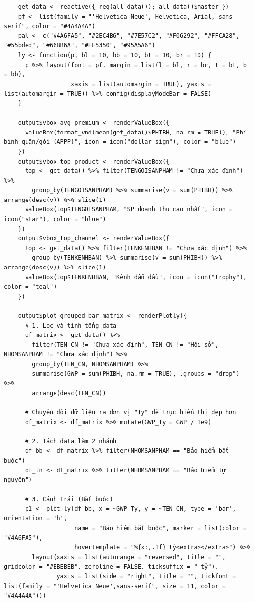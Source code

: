 \documentclass[12pt, a4paper]{article}
\begin{document}
\begin{lstlisting}
    get_data <- reactive({ req(all_data()); all_data()$master })
    pf <- list(family = "'Helvetica Neue', Helvetica, Arial, sans-serif", color = "#4A4A4A")
    pal <- c("#4A6FA5", "#2EC4B6", "#7E57C2", "#F06292", "#FFCA28", "#55bded", "#66BB6A", "#EF5350", "#95A5A6")
    ly <- function(p, bl = 10, bb = 10, bt = 10, br = 10) {
      p %>% layout(font = pf, margin = list(l = bl, r = br, t = bt, b = bb),
                   xaxis = list(automargin = TRUE), yaxis = list(automargin = TRUE)) %>% config(displayModeBar = FALSE)
    }

    output$vbox_avg_premium <- renderValueBox({
      valueBox(format_vnd(mean(get_data()$PHIBH, na.rm = TRUE)), "Phí bình quân/gói (APPP)", icon = icon("dollar-sign"), color = "blue")
    })
    output$vbox_top_product <- renderValueBox({
      top <- get_data() %>% filter(TENGOISANPHAM != "Chưa xác định") %>%
        group_by(TENGOISANPHAM) %>% summarise(v = sum(PHIBH)) %>% arrange(desc(v)) %>% slice(1)
      valueBox(top$TENGOISANPHAM, "SP doanh thu cao nhất", icon = icon("star"), color = "blue")
    })
    output$vbox_top_channel <- renderValueBox({
      top <- get_data() %>% filter(TENKENHBAN != "Chưa xác định") %>%
        group_by(TENKENHBAN) %>% summarise(v = sum(PHIBH)) %>% arrange(desc(v)) %>% slice(1)
      valueBox(top$TENKENHBAN, "Kênh dẫn đầu", icon = icon("trophy"), color = "teal")
    })

    output$plot_grouped_bar_matrix <- renderPlotly({
      # 1. Lọc và tính tổng data
      df_matrix <- get_data() %>%
        filter(TEN_CN != "Chưa xác định", TEN_CN != "Hội sở", NHOMSANPHAM != "Chưa xác định") %>%
        group_by(TEN_CN, NHOMSANPHAM) %>% 
        summarise(GWP = sum(PHIBH, na.rm = TRUE), .groups = "drop") %>%
        arrange(desc(TEN_CN)) 
      
      # Chuyển đổi dữ liệu ra đơn vị "Tỷ" để trục hiển thị đẹp hơn
      df_matrix <- df_matrix %>% mutate(GWP_Ty = GWP / 1e9)
      
      # 2. Tách data làm 2 nhánh
      df_bb <- df_matrix %>% filter(NHOMSANPHAM == "Bảo hiểm bắt buộc")
      df_tn <- df_matrix %>% filter(NHOMSANPHAM == "Bảo hiểm tự nguyện")
      
      # 3. Cánh Trái (Bắt buộc)
      p1 <- plot_ly(df_bb, x = ~GWP_Ty, y = ~TEN_CN, type = 'bar', orientation = 'h',
                    name = "Bảo hiểm bắt buộc", marker = list(color = "#4A6FA5"),
                    hovertemplate = "%{x:,.1f} tỷ<extra></extra>") %>%
        layout(xaxis = list(autorange = "reversed", title = "", gridcolor = "#EBEBEB", zeroline = FALSE, ticksuffix = " tỷ"),
               yaxis = list(side = "right", title = "", tickfont = list(family = "'Helvetica Neue',sans-serif", size = 11, color = "#4A4A4A")))
      

\end{lstlisting}
\end{document}
